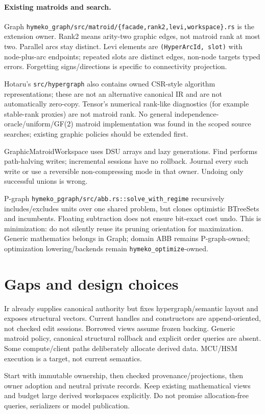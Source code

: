 \documentclass[10pt,a4paper]{article}
\newcommand{\code}[1]{{\small\nolinkurl{#1}}}
\begin{document}
\paragraph{Existing matroids and search.}
Graph \code{hymeko_graph/src/matroid/{facade,rank2,levi,workspace}.rs} is the extension owner. Rank2 means arity-two graphic edges, not matroid rank at most two. Parallel arcs stay distinct. Levi elements are \code{(HyperArcId, slot)} with node-plus-arc endpoints; repeated slots are distinct edges, non-node targets typed errors. Forgetting signs/directions is specific to connectivity projection.

Hotaru's \code{src/hypergraph} also contains owned CSR-style algorithm representations; these are not an alternative canonical IR and are not automatically zero-copy. Tensor's numerical rank-like diagnostics (for example stable-rank proxies) are not matroid rank. No general independence-oracle/uniform/GF(2) matroid implementation was found in the scoped source searches; existing graphic policies should be extended first.

GraphicMatroidWorkspace uses DSU arrays and lazy generations. Find performs path-halving writes; incremental sessions have no rollback. Journal every such write or use a reversible non-compressing mode in that owner. Undoing only successful unions is wrong.

P-graph \code{hymeko_pgraph/src/abb.rs::solve_with_regime} recursively includes/excludes units over one shared problem, but clones optimistic BTreeSets and incumbents. Floating subtraction does not ensure bit-exact cost undo. This is minimization: do not silently reuse its pruning orientation for maximization. Generic mathematics belongs in Graph; domain ABB remains P-graph-owned; optimization lowering/backends remain \code{hymeko_optimize}-owned.

\section{Gaps and design choices}
\label{sec:gaps}
Ir already supplies canonical authority but fixes hypergraph/semantic layout and exposes structural vectors. Current handles and constructors are append-oriented, not checked edit sessions. Borrowed views assume frozen backing. Generic matroid policy, canonical structural rollback and explicit order queries are absent. Some compute/client paths deliberately allocate derived data. MCU/HSM execution is a target, not current semantics.

Start with immutable ownership, then checked provenance/projections, then owner adoption and neutral private records. Keep existing mathematical views and budget large derived workspaces explicitly. Do not promise allocation-free queries, serializers or model publication.
\end{document}
